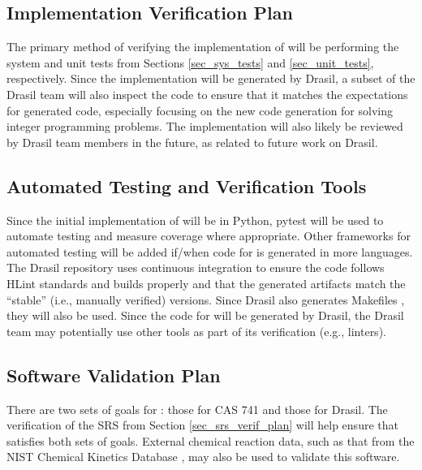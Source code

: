 \documentclass[12pt, titlepage]{article}
\begin{document}
\subsection{Implementation Verification Plan}

The primary method of verifying the implementation of \progname{} will be
performing the system and unit tests from Sections \ref{sec_sys_tests} and
\ref{sec_unit_tests}, respectively. Since the implementation will be
generated by Drasil, a subset of the Drasil team will also inspect the code to
ensure that it matches the expectations for generated code, especially focusing
on the new code generation for solving integer programming problems.
The implementation will also likely be reviewed by Drasil team members in the
future, as related to future work on Drasil.

\subsection{Automated Testing and Verification Tools}

Since the initial implementation of \progname{} will be in Python, pytest will
be used to automate testing and measure coverage where appropriate. Other
frameworks for automated testing will be added if/when code for \progname{} is
generated in more languages. The Drasil repository uses continuous integration
to ensure the code follows HLint standards and builds properly and that the
generated artifacts match the ``stable'' (i.e., manually verified) versions.
Since Drasil also generates Makefiles \cite{carette_drasil_2021}, they will
also be used. Since the code for \progname{} will be generated
by Drasil, the Drasil team may potentially use other tools as part of its
verification (e.g., linters).

\subsection{Software Validation Plan}

There are two sets of goals for \progname{}: those for CAS 741 and those for
Drasil. The verification of the SRS from Section \ref{sec_srs_verif_plan}
will help ensure that \progname{} satisfies both sets of goals. External
chemical reaction data, such as that from the NIST Chemical Kinetics Database
\cite{national_institute_of_standards_and_technology_nist_2023}, may also be
used to validate this software.

\newpage
\end{document}

